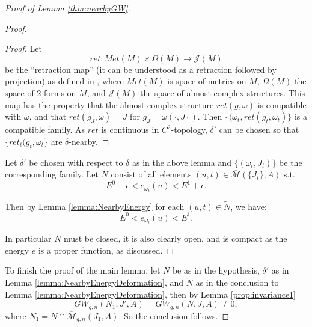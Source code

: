 \documentclass{amsart}
\numberwithin{equation}{section}
\newtheorem{proposition}[equation]{Proposition}
\theoremstyle{definition}
\theoremstyle{remark}
\DeclareMathOperator{\lcs}{lcs}
\begin{document}
\begin{proof} [Proof of Lemma  \ref{thm:nearbyGW}]
\begin{proof}
\begin{proof}
    Let $$ret: Met (M) \times \Omega (M)  \to \mathcal{J} (M)  $$ be the  ``retraction map'' (it can be understood as a retraction followed by projection) as defined in \cite [Prop 2.50]{citeMcDuffSalamonIntroductiontosymplectictopology}, where $Met (M)$ is  space of metrics on $M$, $\Omega (M)$ the space of 2-forms on $M$, and $ \mathcal{J} (M)$ the space of almost complex structures. This map has the property that the almost complex structure $ret (g,\omega)$ is compatible with $\omega$, and that $ret (g _{J}, \omega ) = J$ for $g _{J} = \omega (\cdot, J \cdot) $. Then $ \{(\omega _{t}, ret (g _{t}, \omega _{t})   \} $ is a compatible  family.
   As $ret  $ is continuous in $C ^{2} $-topology, $\delta'$ can be chosen so that $ \{ ret _{t} (g _{t}, \omega _{t}    \} $ are $\delta$-nearby.
\end {proof}
Let $\delta'$ be chosen with respect to $\delta$ as in the above lemma and $\{ (\omega _{t}, J _{t}  )\}$ be the corresponding family.
     Let $\widetilde{N}  $ consist of all elements $(u,t) \in \overline{\mathcal{M}} (\{J _{t} \},A)$ s.t. $$E ^{0}  -\epsilon  < e _{\omega _{t} }  (u) < E ^{1}  +\epsilon.
     $$

Then by Lemma \ref{lemma:NearbyEnergy} for each $(u,t) \in \widetilde{N}  $, we have:
$$E ^{0} < e _{\omega _{t} }  (u) < E ^{1}.$$

    In particular $\widetilde{N}$ must be closed, it is also clearly open, and is compact as the energy $e$ is a proper function, as discussed.
 \end{proof}
To finish the proof of the main lemma, let $N$ be as in the hypothesis, $\delta'$ as in Lemma \ref{lemma:NearbyEnergyDeformation}, and $\widetilde{N} $ as in the conclusion to Lemma \ref{lemma:NearbyEnergyDeformation}, then by Lemma \ref{prop:invariance1} $$GW _{g,n} (N_1, J', A) =  GW _{g,n} (N, J, A) \neq 0,$$ where $N _{1} = \widetilde{N} \cap \overline{\mathcal{M}} _{g,n}  (J _{1},A)  $. So the conclusion follows.
\end {proof}
\end{document}
